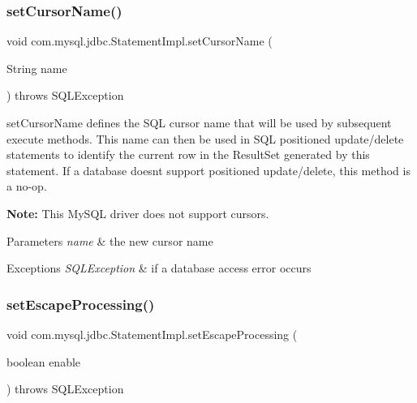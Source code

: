 \subsubsection{\texorpdfstring{set\+Cursor\+Name()}{setCursorName()}}
{\footnotesize\ttfamily void com.\+mysql.\+jdbc.\+Statement\+Impl.\+set\+Cursor\+Name (\begin{DoxyParamCaption}\item[{String}]{name }\end{DoxyParamCaption}) throws S\+Q\+L\+Exception}

set\+Cursor\+Name defines the S\+QL cursor name that will be used by subsequent execute methods. This name can then be used in S\+QL positioned update/delete statements to identify the current row in the Result\+Set generated by this statement. If a database doesn\textquotesingle{}t support positioned update/delete, this method is a no-\/op.

{\bfseries Note\+:} This My\+S\+QL driver does not support cursors. 


\begin{DoxyParams}{Parameters}
{\em name} & the new cursor name\\
\hline
\end{DoxyParams}

\begin{DoxyExceptions}{Exceptions}
{\em S\+Q\+L\+Exception} & if a database access error occurs \\
\hline
\end{DoxyExceptions}
\mbox{\label{classcom_1_1mysql_1_1jdbc_1_1_statement_impl_abf630b98fd3807a2973262747e98e9fd}} 
\subsubsection{\texorpdfstring{set\+Escape\+Processing()}{setEscapeProcessing()}}
{\footnotesize\ttfamily void com.\+mysql.\+jdbc.\+Statement\+Impl.\+set\+Escape\+Processing (\begin{DoxyParamCaption}\item[{boolean}]{enable }\end{DoxyParamCaption}) throws S\+Q\+L\+Exception}

